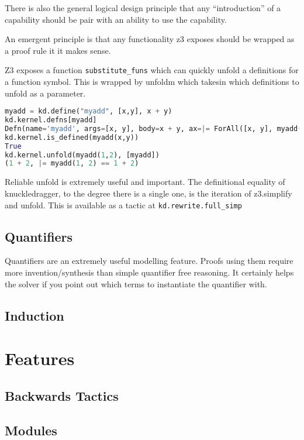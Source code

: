 \documentclass{article}%
\begin{document}
There is also the general logical design principle that any “introduction” of a capability should be pair with an ability to use the capability.

An emergent principle is that any functionality z3 exposes should be wrapped as a proof rule it it makes sense.

Z3 exposes a function \lstinline|substitute_funs| which can quickly unfold a definitions for a function symbol. This is wrapped by unfoldm which takesin which definitions to unfold as a parameter.


\begin{lstlisting}[language=Python, caption=Definitions]
myadd = kd.define("myadd", [x,y], x + y)
kd.kernel.defns[myadd]
Defn(name='myadd', args=[x, y], body=x + y, ax=|= ForAll([x, y], myadd(x, y) == x + y), subst_funs_body=Var(0) + Var(1))
kd.kernel.is_defined(myadd(x,y))
True
kd.kernel.unfold(myadd(1,2), [myadd])
(1 + 2, |= myadd(1, 2) == 1 + 2)
\end{lstlisting}


Reliable unfold is extremely useful and important. The definitional equality of knuckledragger, to the degree there is a single one, is the iteration of z3.simplify and unfold. This is available as a tactic at \lstinline|kd.rewrite.full_simp|


\subsection{Quantifiers}
Quantifiers are an extremely useful modelling feature. Proofs using them require more invention/synthesis than simple quantifier free reasoning. It certainly helps the solver if you point out which terms to instantiate the quantifier with.


\subsection{Induction}


\section{Features}

\subsection{Backwards Tactics}
\subsection{Modules}
\end{document}
